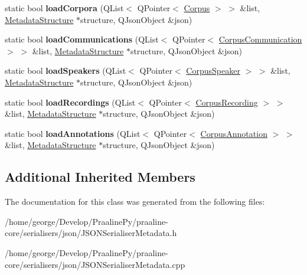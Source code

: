 \begin{DoxyCompactItemize}
\item 
\mbox{\label{class_j_s_o_n_serialiser_metadata_a70f1e16b9fb85fc3408d0e1124317f9c}} 
static bool {\bfseries load\+Corpora} (Q\+List$<$ Q\+Pointer$<$ \hyperlink{class_corpus}{Corpus} $>$ $>$ \&list, \hyperlink{class_metadata_structure}{Metadata\+Structure} $\ast$structure, Q\+Json\+Object \&json)
\item 
\mbox{\label{class_j_s_o_n_serialiser_metadata_adbf898e3a4f943d992e39510776324cc}} 
static bool {\bfseries load\+Communications} (Q\+List$<$ Q\+Pointer$<$ \hyperlink{class_corpus_communication}{Corpus\+Communication} $>$ $>$ \&list, \hyperlink{class_metadata_structure}{Metadata\+Structure} $\ast$structure, Q\+Json\+Object \&json)
\item 
\mbox{\label{class_j_s_o_n_serialiser_metadata_ab965ef851f396c2b936b698d93aad6de}} 
static bool {\bfseries load\+Speakers} (Q\+List$<$ Q\+Pointer$<$ \hyperlink{class_corpus_speaker}{Corpus\+Speaker} $>$ $>$ \&list, \hyperlink{class_metadata_structure}{Metadata\+Structure} $\ast$structure, Q\+Json\+Object \&json)
\item 
\mbox{\label{class_j_s_o_n_serialiser_metadata_acdd71c215d76e5dd59957437aacf2006}} 
static bool {\bfseries load\+Recordings} (Q\+List$<$ Q\+Pointer$<$ \hyperlink{class_corpus_recording}{Corpus\+Recording} $>$ $>$ \&list, \hyperlink{class_metadata_structure}{Metadata\+Structure} $\ast$structure, Q\+Json\+Object \&json)
\item 
\mbox{\label{class_j_s_o_n_serialiser_metadata_a129017f76624252de0fce6f503f2ffa0}} 
static bool {\bfseries load\+Annotations} (Q\+List$<$ Q\+Pointer$<$ \hyperlink{class_corpus_annotation}{Corpus\+Annotation} $>$ $>$ \&list, \hyperlink{class_metadata_structure}{Metadata\+Structure} $\ast$structure, Q\+Json\+Object \&json)
\end{DoxyCompactItemize}
\subsection*{Additional Inherited Members}


The documentation for this class was generated from the following files\+:\begin{DoxyCompactItemize}
\item 
/home/george/\+Develop/\+Praaline\+Py/praaline-\/core/serialisers/json/J\+S\+O\+N\+Serialiser\+Metadata.\+h\item 
/home/george/\+Develop/\+Praaline\+Py/praaline-\/core/serialisers/json/J\+S\+O\+N\+Serialiser\+Metadata.\+cpp\end{DoxyCompactItemize}
